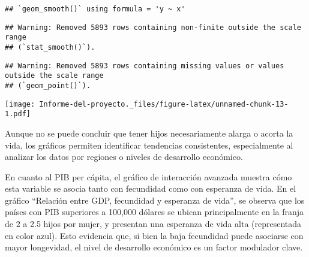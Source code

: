 \documentclass[
]{article}
\begin{document}
\begin{verbatim}
## `geom_smooth()` using formula = 'y ~ x'
\end{verbatim}

\begin{verbatim}
## Warning: Removed 5893 rows containing non-finite outside the scale range
## (`stat_smooth()`).
\end{verbatim}

\begin{verbatim}
## Warning: Removed 5893 rows containing missing values or values outside the scale range
## (`geom_point()`).
\end{verbatim}

\texttt{[image: Informe-del-proyecto.\_files/figure-latex/unnamed-chunk-13-1.pdf]}

Aunque no se puede concluir que tener hijos necesariamente alarga o
acorta la vida, los gráficos permiten identificar tendencias
consistentes, especialmente al analizar los datos por regiones o niveles
de desarrollo económico.

En cuanto al PIB per cápita, el gráfico de interacción avanzada muestra
cómo esta variable se asocia tanto con fecundidad como con esperanza de
vida. En el gráfico ``Relación entre GDP, fecundidad y esperanza de
vida'', se observa que los países con PIB superiores a 100,000 dólares
se ubican principalmente en la franja de 2 a 2.5 hijos por mujer, y
presentan una esperanza de vida alta (representada en color azul). Esto
evidencia que, si bien la baja fecundidad puede asociarse con mayor
longevidad, el nivel de desarrollo económico es un factor modulador
clave.
\end{document}
